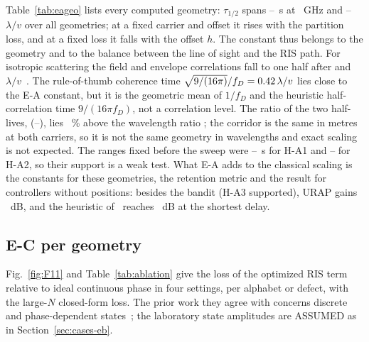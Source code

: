 Table~\ref{tab:eageo} lists every computed geometry: $\tau_{1/2}$ spans
\numEaTauHalfMinS--\numEaTauHalfMaxS~s at \numEaFcOneGHz~GHz and
\numEaTauLambdaVMin--\numEaTauLambdaVMax~$\lambda/v$ over all geometries; at a fixed carrier and
offset it rises with the partition loss, and at a fixed loss it falls with the offset $h$. The
constant thus belongs to the geometry and to the balance between the line of sight and the RIS
path. For isotropic scattering the field and envelope correlations fall to one
half after \numClarkeFieldHalf{} and \numClarkeEnvHalf{} $\lambda/v$~\cite{Clarke1968}. The
rule-of-thumb coherence time $\sqrt{9/(16\pi)}/f_D=0.42\,\lambda/v$ lies
close to the E-A constant, but it is the geometric mean of $1/f_D$ and the heuristic
half-correlation time $9/(16\pi f_D)$, not a correlation level. The ratio of the two half-lives, \numEaRatio{}
(\numEaRatioLo--\numEaRatioHi), lies \numEaRatioOffsetPct~\% above the wavelength ratio
\numEaRatioPred; the corridor is the same in metres at both carriers, so it is not the same
geometry in wavelengths and exact scaling is not expected. The ranges fixed before the sweep
were \numEaHaOneLoS--\numEaHaOneHiS~s for H-A1 and \numEaHaTwoLo--\numEaHaTwoHi{} for H-A2, so
their support is a weak test. What E-A adds to the classical scaling is the constants for these
geometries, the retention metric and the result for controllers without positions: besides the
bandit (H-A3 supported), URAP gains \numEaGainUrap~dB, and the heuristic
of~\cite{Mishra2025WCL} reaches \numEaGainWclFast~dB at the shortest delay.

\subsection{E-C per geometry}
Fig.~\ref{fig:F11} and Table~\ref{tab:ablation} give the loss of the optimized RIS
term relative to ideal continuous phase in four settings, per alphabet or defect, with the
large-$N$ closed-form loss. The prior work they agree with concerns discrete and
phase-dependent states~\cite{WuZhang2020Discrete,Abeywickrama2020Practical}; the laboratory
state amplitudes are ASSUMED as in Section~\ref{sec:cases-eb}.

\begin{figure}[t]
\centering
{}
\end{figure}

